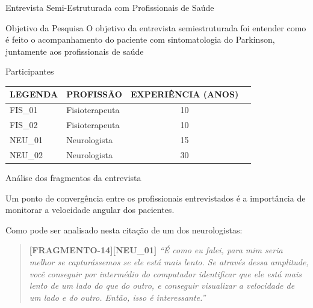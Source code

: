 \documentclass{beamer}
\begin{document}
\begin{frame}{Entrevista Semi-Estruturada com Profissionais de Saúde} 
    \begin{block}{Objetivo da Pesquisa}
    O objetivo da entrevista semiestruturada foi entender como é feito o acompanhamento do paciente com sintomatologia do Parkinson, juntamente aos profissionais de saúde
    \end{block}
		\begin{block}{Participantes}
			\begin{table}[h]
			\begin{tabular}{|l|l|c|c|}
			\hline
			\textbf{LEGENDA} & \textbf{PROFISSÃO}             & \multicolumn{1}{|l|}{\textbf{EXPERIÊNCIA (ANOS)}} \\ \hline
			FIS\_01          & Fisioterapeuta & 10                                                \\ \hline
			FIS\_02          & Fisioterapeuta    & 10                                                \\ \hline
			NEU\_01          & Neurologista            & 15                                                \\ \hline
			NEU\_02          & Neurologista            & 30                                                \\ \hline
			\end{tabular}
			\end{table}
    \end{block}
\end{frame} 


\begin{frame}{Análise dos fragmentos da entrevista} 
    \begin{block}{}			
			Um ponto de convergência entre os profissionais entrevistados é a importância de monitorar a velocidade angular dos pacientes.
		\end{block}
		
		\begin{block}{}
					Como pode ser analisado nesta citação de um dos neurologistas:
			\begin{quote}
				\textbf{[FRAGMENTO-14][NEU\_01]} 
					\emph{
						``É como eu falei, para mim seria melhor se capturássemos se ele está mais lento. Se através dessa amplitude, você conseguir por intermédio do computador identificar que ele está mais lento de um lado do que do outro, e conseguir visualizar a velocidade de um lado e do outro. Então, isso é interessante.''
			}
			\end{quote}			
    \end{block}
\end{frame} 
\end{document}
